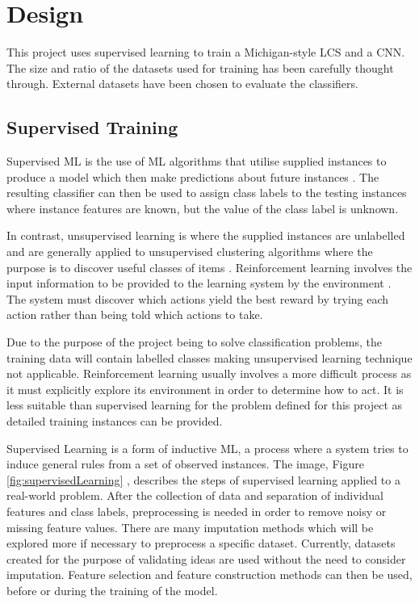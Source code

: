 \chapter{Design}
This project uses supervised learning to train a Michigan-style LCS and a CNN. The size and ratio of the datasets used for training has been carefully thought through. External datasets have been chosen to evaluate the classifiers.

\section{Supervised Training}
\label{subsec:supervised}
Supervised ML is the use of ML algorithms that utilise supplied instances to produce a model which then make predictions about future instances \cite{kotsiantis2007supervised}. The resulting classifier can then be used to assign class labels to the testing instances where instance features are known, but the value of the class label is unknown.  

In contrast, unsupervised learning is where the supplied instances are unlabelled and are generally applied to unsupervised clustering algorithms where the purpose is to discover useful classes of items \cite{jain1999data}. 
Reinforcement learning involves the input information to be provided to the learning system by the environment \cite{barto1997reinforcement}. The system must discover which actions yield the best reward by trying each action rather than being told which actions to take. 

Due to the purpose of the project being to solve classification problems, the training data will contain labelled classes making unsupervised learning technique not applicable. Reinforcement learning usually involves a more difficult process as it must explicitly explore its environment in order to determine how to act.  It is less suitable than supervised learning for the problem defined for this project as detailed training instances can be provided.

Supervised Learning is a form of inductive ML, a process where a system tries to induce general rules from a set of observed instances. The image, Figure \ref{fig:supervisedLearning} \cite{kotsiantis2007supervised}, describes the steps of supervised learning applied to a real-world problem. After the collection of data and separation of individual features and class labels, preprocessing is needed in order to remove noisy or missing feature values. There are many imputation methods which will be explored more if necessary to preprocess a specific dataset. Currently, datasets created for the purpose of validating ideas are used without the need to consider imputation. Feature selection and feature construction methods can then be used, before or during the training of the model.

